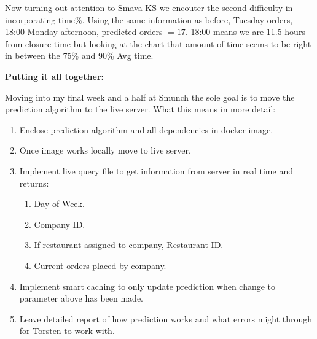 \documentclass[12pt]{article}
\begin{document}
Now turning out attention to Smava KS we encouter the second difficulty in incorporating time\%. Using the same information as before, Tuesday orders, 18:00 Monday afternoon, predicted orders $=17$. 18:00 means we are 11.5 hours from closure time but looking at the chart that amount of time seems to be right in between the 75\% and 90\% Avg time. 


\vspace{.25cm}

\textbf{Putting it all together:} 

Moving into my final week and a half at Smunch the sole goal is to move the prediction algorithm to the live server. What this means in more detail:

\begin{enumerate}
\item Enclose prediction algorithm and all dependencies in docker image.
\item Once image works locally move to live server.
\item Implement live query file to get information from server in real time and returns:
\begin{enumerate}
\item Day of Week.
\item Company ID.
\item If restaurant assigned to company, Restaurant ID.
\item Current orders placed by company.
\end{enumerate}
\item Implement smart caching to only update prediction when change to parameter above has been made.
\item Leave detailed report of how prediction works and what errors might through for Torsten to work with.
\end{enumerate}
\end{document}

